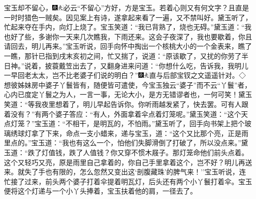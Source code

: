 宝玉却不留心，{\includegraphics[width=3mm]{../Images/00004}\includegraphics[width=3mm]{../Images/00012}\footnotesize \kaishu 必云``不留心''方好，方是宝玉。若着心则又有何文字？且直是一时时猎色一贼矣。}因见案上有诗，遂拿起来看了一遍，又不禁叫好。黛玉听了，忙起来夺在手内，向灯上烧了。宝玉笑道：``我已背熟了，烧也无碍。''黛玉道：``我也好了些，多谢你一天来几次瞧我，下雨还来。这会子夜深了，我也要歇着，你且请回去，明儿再来。''宝玉听说，回手向怀中掏出一个核桃大小的一个金表来，瞧了一瞧，那针已指到戌末亥初之间，忙又揣了，说道：``原该歇了，又扰的你劳了半日神。''说着，披蓑戴笠出去了，又翻身进来问道：``你想什么吃，告诉我，我明儿一早回老太太，岂不比老婆子们说的明白？''{\includegraphics[width=3mm]{../Images/00004}\includegraphics[width=3mm]{../Images/00012}\footnotesize \kaishu 直与后部宝钗之文遥遥针对。◇想彼姊妹房中婆子丫鬟皆有，随便皆可遣使，今宝玉独云``婆子''而不云``丫鬟''者，心内已度定丫鬟之为人，一言一事，无论大小，是方无错谬者也，一何可笑！}黛玉笑道：``等我夜里想着了，明儿早起告诉你。你听雨越发紧了，快去罢。可有人跟着没有？''有两个婆子答应：``有人，外面拿着伞点着灯笼呢。''黛玉笑道：``这个天点灯笼？''宝玉道：``不相干，是明瓦的，不怕雨。''黛玉听了，回手向书架上把个玻璃绣球灯拿了下来，命点一支小蜡来，递与宝玉，道：``这个又比那个亮，正是雨里点的。''宝玉道：``我也有这么一个，怕他们失脚滑倒了打破了，所以没点来。''黛玉道：``跌了灯值钱，跌了人值钱？你又穿不惯木屐子。那灯笼命他们前头点着。这个又轻巧又亮，原是雨里自己拿着的，你自己手里拿着这个，岂不好？明儿再送来。就失了手也有限的，怎么忽然又变出这`剖腹藏珠'的脾气来！''宝玉听说，连忙接了过来，前头两个婆子打着伞提着明瓦灯，后头还有两个小丫鬟打着伞。宝玉便将这个灯递与一个小丫头捧着，宝玉扶着他的肩，一径去了。

